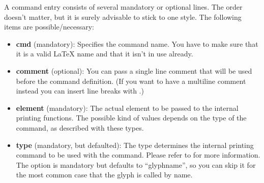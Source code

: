 \documentclass{article}
\begin{document}
\medskip
A command entry consists of several mandatory or optional lines.
The order doesn't matter, but it is surely advisable to stick to one style.
The following items are possible/necessary:
\begin{itemize}
	\item \textsf{\textbf{cmd} (mandatory)}: Specifies the command name. 
	You have to make sure that it is a valid \LaTeX{} name and that it isn't in use already.
	\item \textsf{\textbf{comment} (optional)}: You can pass a single line comment that will be used before the command definition.
	(If you want to have a multiline comment instead you can insert line breaks with .)
	\item \textsf{\textbf{element} (mandatory)}: The actual element to be passed to the internal printing functions.
	The possible kind of values depends on the type of the command, as described with these types.
	\item \textsf{\textbf{type} (mandatory, but defaulted)}: The type determines the internal printing command to be used with the command.
	Please refer to  for more information.
	The option is mandatory but defaults to “glyphname”, so you can skip it for the most common case that the glyph is called by name.


\end{itemize}
\end{document}
